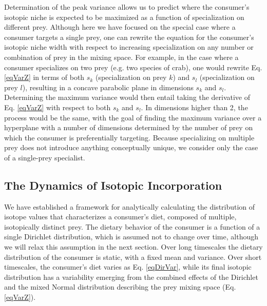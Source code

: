 \documentclass{frontiersSCNS}
\begin{document}
Determination of the peak variance allows us to predict where the consumer's isotopic niche is expected to be maximized as a function of specialization on different prey.
Although here we have focused on the special case where a consumer targets a single prey, one can rewrite the equation for the consumer's isotopic niche width with respect to increasing specialization on any number or combination of prey in the mixing space.
For example, in the case where a consumer specializes on two prey (e.g. two species of crab), one would rewrite Eq. \ref{eqVarZ} in terms of both $s_k$ (specialization on prey $k$) and $s_l$ (specialization on prey $l$), resulting in a concave parabolic plane in dimensions $s_k$ and $s_l$.
Determining the maximum variance would then entail taking the derivative of Eq. \ref{eqVarZ} with respect to both $s_k$ and $s_l$.
In dimensions higher than 2, the process would be the same, with the goal of finding the maximum variance over a hyperplane with a number of dimensions determined by the number of prey on which the consumer is preferentially targeting.
Because specializing on multiple prey does not introduce anything conceptually unique, we consider only the case of a single-prey specialist.



\subsection*{The Dynamics of Isotopic Incorporation}
We have established a framework for analytically calculating the distribution of isotope values that characterizes a consumer's diet, composed of multiple, isotopically distinct prey.
The dietary behavior of the consumer is a function of a single Dirichlet distribution, which is assumed not to change over time, although we will relax this assumption in the next section.
Over long timescales the dietary distribution of the consumer is static, with a fixed mean and variance.
Over short timescales, the consumer's diet varies as Eq. \ref{eqDirVar}, while its final isotopic distribution has a variability emerging from the combined effects of the Dirichlet and the mixed Normal distribution describing the prey mixing space (Eq. \ref{eqVarZ}).
\end{document}
